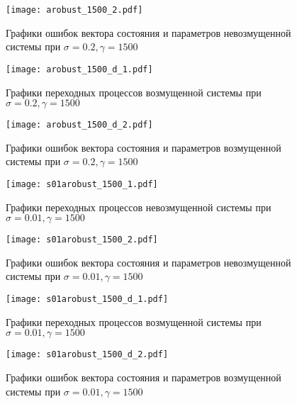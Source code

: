 \begin{figure}[h!]
	\centering
	\texttt{[image: arobust\_1500\_2.pdf]}
	\caption{Графики ошибок вектора состояния и параметров невозмущенной системы при $\sigma = 0.2, \gamma = 1500$}
	\label{img_ar1500_2}
\end{figure}

\begin{figure}[h!]
	\centering
	\texttt{[image: arobust\_1500\_d\_1.pdf]}
	\caption{Графики переходных процессов возмущенной системы при $\sigma = 0.2, \gamma = 1500$}
	\label{img_ar1500d}
\end{figure}

\begin{figure}[h!]
	\centering
	\texttt{[image: arobust\_1500\_d\_2.pdf]}
	\caption{Графики ошибок вектора состояния и параметров возмущенной системы при $\sigma = 0.2, \gamma = 1500$}
	\label{img_ar1500_d2}
\end{figure}


\begin{figure}[h!]
	\centering
	\texttt{[image: s01arobust\_1500\_1.pdf]}
	\caption{Графики переходных процессов невозмущенной системы при $\sigma = 0.01, \gamma = 1500$}
	\label{img_s01ar1500}
\end{figure}

\begin{figure}[h!]
	\centering
	\texttt{[image: s01arobust\_1500\_2.pdf]}
	\caption{Графики ошибок вектора состояния и параметров невозмущенной системы при $\sigma = 0.01, \gamma = 1500$}
	\label{img_s01ar1500_2}
\end{figure}

\begin{figure}[h!]
	\centering
	\texttt{[image: s01arobust\_1500\_d\_1.pdf]}
	\caption{Графики переходных процессов возмущенной системы при $\sigma = 0.01, \gamma = 1500$}
	\label{img_s01ar1500d}
\end{figure}

\begin{figure}[h!]
	\centering
	\texttt{[image: s01arobust\_1500\_d\_2.pdf]}
	\caption{Графики ошибок вектора состояния и параметров возмущенной системы при $\sigma = 0.01, \gamma = 1500$}
	\label{img_s01ar1500_d2}
\end{figure}


\newpage
\mbox{}
\newpage
\clearpage
